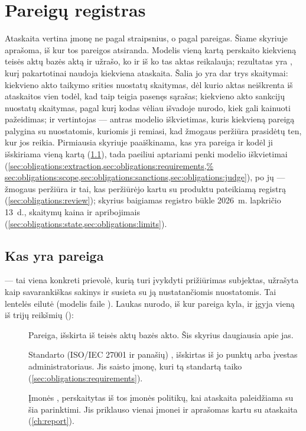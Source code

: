 \chapter{Pareigų registras}\label{ch:obligations}

Ataskaita vertina įmonę ne pagal straipsnius, o pagal pareigas. Šiame skyriuje aprašoma, iš kur
tos pareigos atsiranda. Modelis vieną kartą perskaito kiekvieną teisės aktų bazės aktą ir
užrašo, ko ir iš ko tas aktas reikalauja; rezultatas yra , kurį
pakartotinai naudoja kiekviena ataskaita. Šalia jo yra dar trys skaitymai: kiekvieno akto
taikymo srities nuostatų skaitymas, dėl kurio aktas neiškrenta iš ataskaitos vien todėl, kad
taip teigia pasenęs sąrašas; kiekvieno akto sankcijų nuostatų skaitymas, pagal kurį kodas vėliau
išvadoje nurodo, kiek gali kainuoti pažeidimas; ir vertintojas --- antras modelio iškvietimas,
kuris kiekvieną pareigą palygina su nuostatomis, kuriomis ji remiasi, kad žmogaus peržiūra
prasidėtų ten, kur jos reikia. Pirmiausia skyriuje paaiškinama, kas yra pareiga ir kodėl ji
išskiriama vieną kartą (\cref{sec:obligations:what}), tada paeiliui aptariami penki modelio
iškvietimai (\cref{sec:obligations:extraction,sec:obligations:requirements,%
sec:obligations:scope,sec:obligations:sanctions,sec:obligations:judge}), po jų --- žmogaus
peržiūra ir tai, kas peržiūrėjo kartu su produktu pateikiamą registrą
(\cref{sec:obligations:review}); skyrius baigiamas registro būkle 2026~m. lapkričio 13~d.,
skaitymų kaina ir apribojimais (\cref{sec:obligations:state,sec:obligations:limits}).


\section{Kas yra pareiga}\label{sec:obligations:what}

 --- tai viena konkreti prievolė, kurią turi įvykdyti prižiūrimas subjektas,
užrašyta kaip savarankiškas sakinys ir susieta su ją nustatančiomis nuostatomis. Tai lentelės
 eilutė (modelis  faile ). Laukas
 nurodo, iš kur pareiga kyla, ir įgyja vieną iš trijų reikšmių
():

\begin{description}
  \item[] Pareiga, išskirta iš teisės aktų bazės akto. Šis skyrius daugiausia apie
    jas.
  \item[] Standarto (ISO/IEC 27001 ir panašių) , išskirtas iš
    jo punktų arba įvestas administratoriaus. Jis saisto įmonę, kuri tą standartą taiko
    (\cref{sec:obligations:requirements}).
  \item[] Įmonės , perskaitytas iš tos įmonės politikų,
    kai ataskaita paleidžiama su šia parinktimi. Jis priklauso vienai įmonei ir aprašomas kartu
    su ataskaita (\cref{ch:report}).
\end{description}

